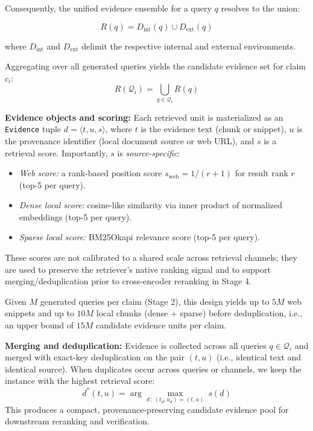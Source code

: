 \documentclass[sn-mathphys, oneside]{sn-jnl}
\begin{document}
Consequently, the unified evidence ensemble for a query $q$ resolves to the union:

\begin{equation}
    R(q) = D_{\mathrm{int}}(q) \cup D_{\mathrm{ext}}(q)
    \label{eq:retrieval_union}
\end{equation}

where $D_{\mathrm{int}}$ and $D_{\mathrm{ext}}$ delimit the respective internal and external environments.

Aggregating over all generated queries yields the candidate evidence set for claim $c_i$:
\begin{equation}
    R(\mathcal{Q}_i) = \bigcup_{q \in \mathcal{Q}_i} R(q)
    \label{eq:retrieval_over_queries}
\end{equation}

\textbf{Evidence objects and scoring:} Each retrieved unit is materialized as an \texttt{Evidence} tuple $d = \langle t, u, s \rangle$, where $t$ is the evidence text (chunk or snippet), $u$ is the provenance identifier (local document source or web URL), and $s$ is a retrieval score. Importantly, $s$ is \emph{source-specific}:
\begin{itemize}
    \item \textit{Web score:} a rank-based position score $s_{\mathrm{web}} = 1/(r+1)$ for result rank $r$ (top-5 per query).
    \item \textit{Dense local score:} cosine-like similarity via inner product of normalized embeddings (top-5 per query).
    \item \textit{Sparse local score:} BM25Okapi relevance score (top-5 per query).
\end{itemize}
These scores are not calibrated to a shared scale across retrieval channels; they are used to preserve the retriever's native ranking signal and to support merging/deduplication prior to cross-encoder reranking in Stage 4.

Given $M$ generated queries per claim (Stage 2), this design yields up to $5M$ web snippets and up to $10M$ local chunks (dense + sparse) before deduplication, i.e., an upper bound of $15M$ candidate evidence units per claim.

\textbf{Merging and deduplication:} Evidence is collected across all queries $q \in \mathcal{Q}_i$ and merged with exact-key deduplication on the pair $(t,u)$ (i.e., identical text and identical source). When duplicates occur across queries or channels, we keep the instance with the highest retrieval score:
\begin{equation}
    d^{*}(t,u) = \arg\max_{d\, :\, (t_d,u_d)=(t,u)}\ s(d)
    \label{eq:dedup_max}
\end{equation}
This produces a compact, provenance-preserving candidate evidence pool for downstream reranking and verification.
\end{document}
